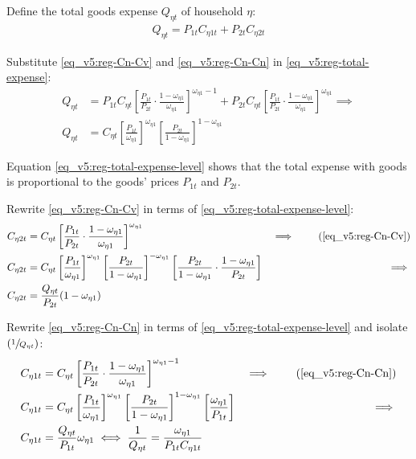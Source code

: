 \documentclass[../thesis.tex]{subfiles}
\begin{document}
Define the total goods expense $Q_{\eta t}$ of household $\eta$:
\begin{align}
	Q_{\eta t} = P_{1 t} C_{\eta 1 t} + P_{2 t} C_{\eta 2 t} \label{eq_v5:reg-total-expense}
\end{align}

Substitute \ref{eq_v5:reg-Cn-Cv} and \ref{eq_v5:reg-Cn-Cn} in \ref{eq_v5:reg-total-expense}:
\begin{align}
	Q_{\eta t} &= P_{1 t} C_{\eta t} \left[ \frac{P_{1 t}}{P_{2 t}} \cdot \frac{1 -\omega_{\eta 1}}{\omega_{\eta 1}} \right]^{\omega_{\eta 1} -1} + P_{2 t} C_{\eta t} \left[ \frac{P_{1 t}}{P_{2 t}} \cdot \frac{1 -\omega_{\eta 1}}{\omega_{\eta 1}} \right]^{\omega_{\eta 1}} \implies \nonumber \\
	Q_{\eta t} &= C_{\eta t} \left[ \frac{P_{1 t}}{\omega_{\eta 1}} \right]^{\omega_{\eta 1}} \left[ \frac{P_{2 t}}{1 -\omega_{\eta 1}} \right]^{1 -\omega_{\eta 1}} \label{eq_v5:reg-total-expense-level}
\end{align}

Equation \ref{eq_v5:reg-total-expense-level} shows that the total expense with goods is proportional to the goods' prices $P_{1 t}$ and $P_{2 t}$.

Rewrite \ref{eq_v5:reg-Cn-Cv} in terms of \ref{eq_v5:reg-total-expense-level}:
\begin{alignat}{2}
	C_{\eta 2 t} &= C_{\eta t} \left[ \frac{P_{1 t}}{P_{2 t}} \cdot \frac{1 -\omega_{\eta 1}}{\omega_{\eta 1}} \right]^{\omega_{\eta 1}} &\implies \tag{\ref{eq_v5:reg-Cn-Cv}} \\
	C_{\eta 2 t} &= C_{\eta t} \left[ \frac{P_{1 t}}{\omega_{\eta 1}} \right]^{\omega_{\eta 1}} \left[ \frac{P_{2 t}}{1 -\omega_{\eta 1}} \right]^{-\omega_{\eta 1}} \left[ \frac{P_{2 t}}{1 -\omega_{\eta 1}} \cdot \frac{1 -\omega_{\eta 1}}{P_{2 t}} \right] &\implies \nonumber \\
	C_{\eta 2 t} &= \frac{Q_{\eta t}}{P_{2 t}} (1 -\omega_{\eta 1}) \label{eq_v5:reg-Cn-Cv-2}
\end{alignat}

Rewrite \ref{eq_v5:reg-Cn-Cn} in terms of \ref{eq_v5:reg-total-expense-level} and isolate $(\sfrac{1}{Q_{\eta t}})$:
	\begin{alignat}{2}
		C_{\eta 1 t} &= C_{\eta t} \left[ \frac{P_{1 t}}{P_{2 t}} \cdot \frac{1 -\omega_{\eta 1}}{\omega_{\eta 1}} \right]^{\omega_{\eta 1} -1} &\implies \tag{\ref{eq_v5:reg-Cn-Cn}} \\
		C_{\eta 1 t} &= C_{\eta t} \left[ \frac{ P_{1 t}}{ \omega_{\eta 1}}\right]^{ \omega_{\eta 1}} \left[ \frac{P_{2 t}}{1-\omega_{\eta 1}} \right]^{1 -\omega_{\eta 1}} \left[ \frac{\omega_{\eta 1}}{P_{1 t}} \right] &\implies \nonumber \\
		C_{\eta 1 t} &= \frac{Q_{\eta t}}{P_{1 t}} \omega_{\eta 1} \iff \frac{1}{Q_{\eta t}} = \frac{\omega_{\eta 1}}{P_{1 t} C_{\eta 1 t}} \label{eq_v5:reg-Cn-Cn-2}
	\end{alignat}
\end{document}
